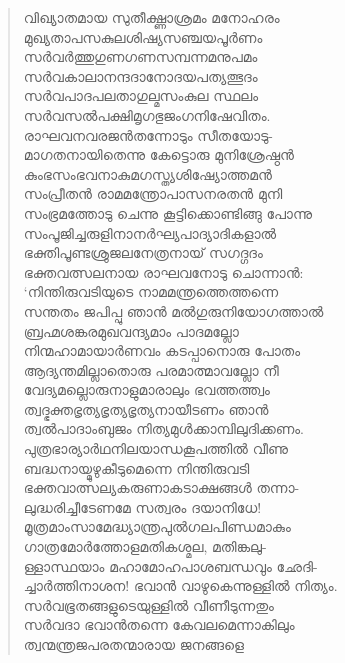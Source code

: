 \begin{verse}
വിഖ്യാതമായ സുതീക്ഷ്ണാശ്രമം മനോഹരം\\
മുഖ്യതാപസകുലശിഷ്യസഞ്ചയപൂര്‍ണം\\
സര്‍വര്‍ത്തുഗുണഗണസമ്പന്നമനുപമം\\
സര്‍വകാലാനന്ദദാനോദയപത്യത്ഭുദം\\
സര്‍വപാദപലതാഗുല്മസംകുല സ്ഥലം\\
സര്‍വസല്‍പക്ഷിമൃഗഭുജംഗനിഷേവിതം.\\
രാഘവനവരജന്‍തന്നോടും സീതയോടു-\\
മാഗതനായിതെന്നു കേട്ടൊരു മുനിശ്രേഷ്ഠന്‍\\
കുംഭസംഭവനാകുമഗസ്ത്യശിഷ്യോത്തമന്‍\\
സംപ്രീതന്‍ രാമമന്ത്രോപാസനരതന്‍ മുനി\\
സംഭ്രമത്തോടു ചെന്നു കൂട്ടിക്കൊണ്ടിങ്ങു പോന്നു\\
സംപൂജിച്ചരുളിനാനര്‍ഘ്യപാദ്യാദികളാല്‍\\
ഭക്തിപൂണ്ടശ്രുജലനേത്രനായ് സഗദ്ഗദം\\
ഭക്തവത്സലനായ രാഘവനോടു ചൊന്നാന്‍:\\
‘നിന്തിരുവടിയുടെ നാമമന്ത്രത്തെത്തന്നെ\\
സന്തതം ജപിപ്പു ഞാന്‍ മല്‍ഗുരുനിയോഗത്താല്‍\\
ബ്രഹ്മശങ്കരമുഖവന്ദ്യമാം പാദമല്ലോ\\
നിന്മഹാമായാര്‍ണവം കടപ്പാനൊരു പോതം\\
ആദ്യന്തമില്ലാതൊരു പരമാത്മാവല്ലോ നീ\\
വേദ്യമല്ലൊരുനാളുമാരാലും ഭവത്തത്ത്വം\\
ത്വദ്ഭക്തഭൃത്യഭൃത്യഭൃത്യനായീടണം ഞാന്‍\\
ത്വല്‍പാദാംബുജം നിത്യമുള്‍ക്കാമ്പിലുദിക്കണം.\\
പുത്രഭാര്യാര്‍ഥനിലയാന്ധകൂപത്തില്‍ വീണു\\
ബദ്ധനായ്മുഴുകീടുമെന്നെ നിന്തിരുവടി\\
ഭക്തവാത്സല്യകരുണാകടാക്ഷങ്ങള്‍ തന്നാ-\\
ലുദ്ധരിച്ചീടേണമേ സത്വരം ദയാനിധേ!\\
മൂത്രമാംസാമേദ്ധ്യാന്ത്രപുല്‍ഗലപിണ്ഡമാകും\\
ഗാത്രമോര്‍ത്തോളമതികശ്മല, മതിങ്കലു-\\
ള്ളാസ്ഥയാം മഹാമോഹപാശബന്ധവും ഛേദി-\\
ച്ചാര്‍ത്തിനാശന! ഭവാന്‍ വാഴുകെന്നുള്ളില്‍ നിത്യം.\\
സര്‍വഭൂതങ്ങളുടെയുള്ളില്‍ വീണീടുന്നതും\\
സര്‍വദാ ഭവാന്‍തന്നെ കേവലമെന്നാകിലും\\
ത്വന്മന്ത്രജപരതന്മാരായ ജനങ്ങളെ\\

\end{verse}
